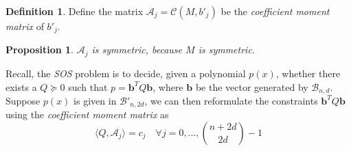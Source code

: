 \documentclass[12pt]{amsart}
\numberwithin{equation}{section}
\newtheorem{prop}[thm]{Proposition}
\theoremstyle{definition}
\newtheorem{definition}[thm]{Definition}
\numberwithin{thm}{section}
\begin{document}
\begin{definition}
Define the matrix $\mathcal{A}_j = \mathcal{C}(M, b'_j)$ be the \emph{coefficient moment matrix} of $b'_j$.
\end{definition}

\begin{prop}
     $\mathcal{A}_j$ is symmetric, because $M$ is symmetric.
\end{prop}

\smallskip
Recall, the \emph{SOS} problem is to decide, given a polynomial $p(x)$, 
whether there exists a $Q \succcurlyeq 0$ such that $p = \mathbf{b}^TQ \mathbf{b}$, where $\mathbf{b}$ be the vector generated by $\mathcal{B}_{n, d}$.
Suppose $p(x)$ is given in $\mathcal{B'}_{n, 2d}$, we can then reformulate the constraints $\mathbf{b}^TQ \mathbf{b}$ using the \emph{coefficient moment matrix} as
\begin{equation}
     \langle Q, \mathcal{A}_j \rangle = c_j \quad \forall j = 0,...,{n + 2d \choose 2d} - 1
\end{equation} 
\end{document}
